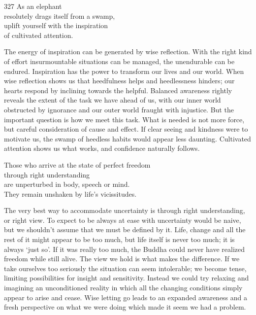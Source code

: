 
\begin{dhpVerse}{327}
\label{dhp-327}
As an elephant\\
resolutely drags itself from a swamp,\\
uplift yourself with the inspiration\\
of cultivated attention.
\end{dhpVerse}

\begin{dhpRefl}
  The energy of inspiration can be generated by wise reflection. With the right
  kind of effort insurmountable situations can be managed, the unendurable can
  be endured. Inspiration has the power to transform our lives and our world.
  When wise reflection shows us that heedfulness helps and heedlessness hinders;
  our hearts respond by inclining towards the helpful. Balanced awareness
  rightly reveals the extent of the task we have ahead of us, with our inner
  world obstructed by ignorance and our outer world fraught with injustice. But
  the important question is how we meet this task. What is needed is not more
  force, but careful consideration of cause and effect. If clear seeing and
  kindness were to motivate us, the swamp of heedless habits would appear less
  daunting. Cultivated attention shows us what works, and confidence naturally
  follows.
\end{dhpRefl}


\begin{dhpVerse}{96}
\label{dhp-96}
Those who arrive at the state of perfect freedom\\
through right understanding\\
are unperturbed in body, speech or mind.\\
They remain unshaken by life's vicissitudes.
\end{dhpVerse}

\begin{dhpRefl}
  The very best way to accommodate uncertainty is through right understanding,
  or right view. To expect to be always at ease with uncertainty would be naive,
  but we shouldn’t assume that we must be defined by it. Life, change and all
  the rest of it might appear to be too much, but life itself is never too much;
  it is always ‘just so’. If it was really too much, the Buddha could never have
  realized freedom while still alive. The view we hold is what makes the
  difference. If we take ourselves too seriously the situation can seem
  intolerable; we become tense, limiting possibilities for insight and
  sensitivity. Instead we could try relaxing and imagining an unconditioned
  reality in which all the changing conditions simply appear to arise and cease.
  Wise letting go leads to an expanded awareness and a fresh perspective on what
  we were doing which made it seem we had a problem.
\end{dhpRefl}

